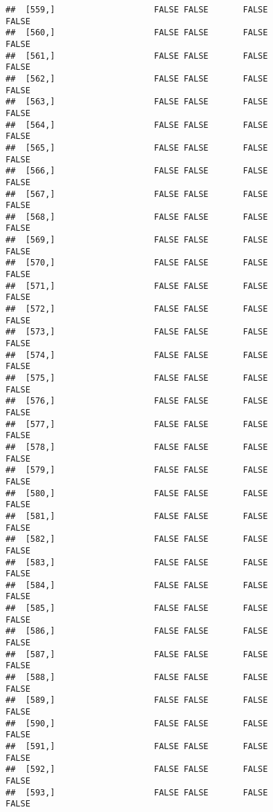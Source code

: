 \documentclass[
]{article}
\begin{document}
\begin{verbatim}
##  [559,]                    FALSE FALSE       FALSE                FALSE
##  [560,]                    FALSE FALSE       FALSE                FALSE
##  [561,]                    FALSE FALSE       FALSE                FALSE
##  [562,]                    FALSE FALSE       FALSE                FALSE
##  [563,]                    FALSE FALSE       FALSE                FALSE
##  [564,]                    FALSE FALSE       FALSE                FALSE
##  [565,]                    FALSE FALSE       FALSE                FALSE
##  [566,]                    FALSE FALSE       FALSE                FALSE
##  [567,]                    FALSE FALSE       FALSE                FALSE
##  [568,]                    FALSE FALSE       FALSE                FALSE
##  [569,]                    FALSE FALSE       FALSE                FALSE
##  [570,]                    FALSE FALSE       FALSE                FALSE
##  [571,]                    FALSE FALSE       FALSE                FALSE
##  [572,]                    FALSE FALSE       FALSE                FALSE
##  [573,]                    FALSE FALSE       FALSE                FALSE
##  [574,]                    FALSE FALSE       FALSE                FALSE
##  [575,]                    FALSE FALSE       FALSE                FALSE
##  [576,]                    FALSE FALSE       FALSE                FALSE
##  [577,]                    FALSE FALSE       FALSE                FALSE
##  [578,]                    FALSE FALSE       FALSE                FALSE
##  [579,]                    FALSE FALSE       FALSE                FALSE
##  [580,]                    FALSE FALSE       FALSE                FALSE
##  [581,]                    FALSE FALSE       FALSE                FALSE
##  [582,]                    FALSE FALSE       FALSE                FALSE
##  [583,]                    FALSE FALSE       FALSE                FALSE
##  [584,]                    FALSE FALSE       FALSE                FALSE
##  [585,]                    FALSE FALSE       FALSE                FALSE
##  [586,]                    FALSE FALSE       FALSE                FALSE
##  [587,]                    FALSE FALSE       FALSE                FALSE
##  [588,]                    FALSE FALSE       FALSE                FALSE
##  [589,]                    FALSE FALSE       FALSE                FALSE
##  [590,]                    FALSE FALSE       FALSE                FALSE
##  [591,]                    FALSE FALSE       FALSE                FALSE
##  [592,]                    FALSE FALSE       FALSE                FALSE
##  [593,]                    FALSE FALSE       FALSE                FALSE

\end{verbatim}
\end{document}
